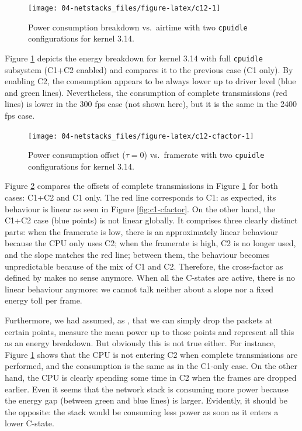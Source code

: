 \documentclass[twoside,nohyper]{tufte-book}
\begin{document}
\begin{figure}

{\centering \texttt{[image: 04-netstacks\_files/figure-latex/c12-1]} 

}

\caption[Power consumption breakdown vs.~airtime with two \texttt{cpuidle} configurations for kernel 3.14.]{Power consumption breakdown vs.~airtime with two \texttt{cpuidle} configurations for kernel 3.14.}\label{fig:c12}
\end{figure}

Figure \ref{fig:c12} depicts the energy breakdown for kernel 3.14 with full \texttt{cpuidle} subsystem (C1+C2 enabled) and compares it to the previous case (C1 only). By enabling C2, the consumption appears to be always lower up to driver level (blue and green lines). Nevertheless, the consumption of complete transmissions (red lines) is lower in the 300 fps case (not shown here), but it is the same in the 2400 fps case.



\begin{figure}

{\centering \texttt{[image: 04-netstacks\_files/figure-latex/c12-cfactor-1]} 

}

\caption[Power consumption offset (\(\tau=0\)) vs.~framerate with two \texttt{cpuidle} configurations for kernel 3.14.]{Power consumption offset (\(\tau=0\)) vs.~framerate with two \texttt{cpuidle} configurations for kernel 3.14.}\label{fig:c12-cfactor}
\end{figure}

Figure \ref{fig:c12-cfactor} compares the offsets of complete transmissions in Figure \ref{fig:c12} for both cases: C1+C2 and C1 only. The red line corresponds to C1: as expected, its behaviour is linear as seen in Figure \ref{fig:c1-cfactor}. On the other hand, the C1+C2 case (blue points) is not linear globally. It comprises three clearly distinct parts: when the framerate is low, there is an approximately linear behaviour because the CPU only uses C2; when the framerate is high, C2 is no longer used, and the slope matches the red line; between them, the behaviour becomes unpredictable because of the mix of C1 and C2. Therefore, the cross-factor as defined by \citet{Serrano2014} makes no sense anymore. When all the C-states are active, there is no linear behaviour anymore: we cannot talk neither about a slope nor a fixed energy toll per frame.

Furthermore, we had assumed, as \citet{Serrano2014}, that we can simply drop the packets at certain points, measure the mean power up to those points and represent all this as an energy breakdown. But obviously this is not true either. For instance, Figure \ref{fig:c12} shows that the CPU is not entering C2 when complete transmissions are performed, and the consumption is the same as in the C1-only case. On the other hand, the CPU is clearly spending some time in C2 when the frames are dropped earlier. Even it seems that the network stack is consuming more power because the energy gap (between green and blue lines) is larger. Evidently, it should be the opposite: the stack would be consuming less power as soon as it enters a lower C-state.
\end{document}
